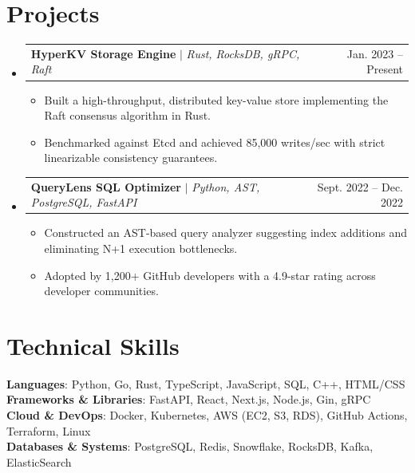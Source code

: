 \documentclass[letterpaper,11pt]{article}
\makeatletter
\newcommand{\resumeItem}[1]{
  \item\small{
    {#1 \vspace{-2pt}}
  }
}
\newcommand{\resumeProjectHeading}[2]{
    \item
    \begin{tabular*}{0.97\textwidth}{l@{\extracolsep{\fill}}r}
      \small#1 & #2 \\
    \end{tabular*}\vspace{-7pt}
}
\newcommand{\resumeSubHeadingListStart}{\begin{itemize}[leftmargin=0.15in, label={}]}
\newcommand{\resumeSubHeadingListEnd}{\end{itemize}}
\newcommand{\resumeItemListStart}{\begin{itemize}}
\newcommand{\resumeItemListEnd}{\end{itemize}\vspace{-5pt}}
\makeatother
\begin{document}
\section{Projects}
    \resumeSubHeadingListStart
      \resumeProjectHeading
          {\textbf{HyperKV Storage Engine} $|$ \emph{Rust, RocksDB, gRPC, Raft}}{Jan. 2023 -- Present}
          \resumeItemListStart
            \resumeItem{Built a high-throughput, distributed key-value store implementing the Raft consensus algorithm in Rust.}
            \resumeItem{Benchmarked against Etcd and achieved 85,000 writes/sec with strict linearizable consistency guarantees.}
          \resumeItemListEnd
      \resumeProjectHeading
          {\textbf{QueryLens SQL Optimizer} $|$ \emph{Python, AST, PostgreSQL, FastAPI}}{Sept. 2022 -- Dec. 2022}
          \resumeItemListStart
            \resumeItem{Constructed an AST-based query analyzer suggesting index additions and eliminating N+1 execution bottlenecks.}
            \resumeItem{Adopted by 1,200+ GitHub developers with a 4.9-star rating across developer communities.}
          \resumeItemListEnd
    \resumeSubHeadingListEnd


\section{Technical Skills}
 \begin{itemize}[leftmargin=0.15in, label={}]
    \small{\item{
     \textbf{Languages}{: Python, Go, Rust, TypeScript, JavaScript, SQL, C++, HTML/CSS} \\
     \textbf{Frameworks \& Libraries}{: FastAPI, React, Next.js, Node.js, Gin, gRPC} \\
     \textbf{Cloud \& DevOps}{: Docker, Kubernetes, AWS (EC2, S3, RDS), GitHub Actions, Terraform, Linux} \\
     \textbf{Databases \& Systems}{: PostgreSQL, Redis, Snowflake, RocksDB, Kafka, ElasticSearch}
    }}
 \end{itemize}

\end{document}
